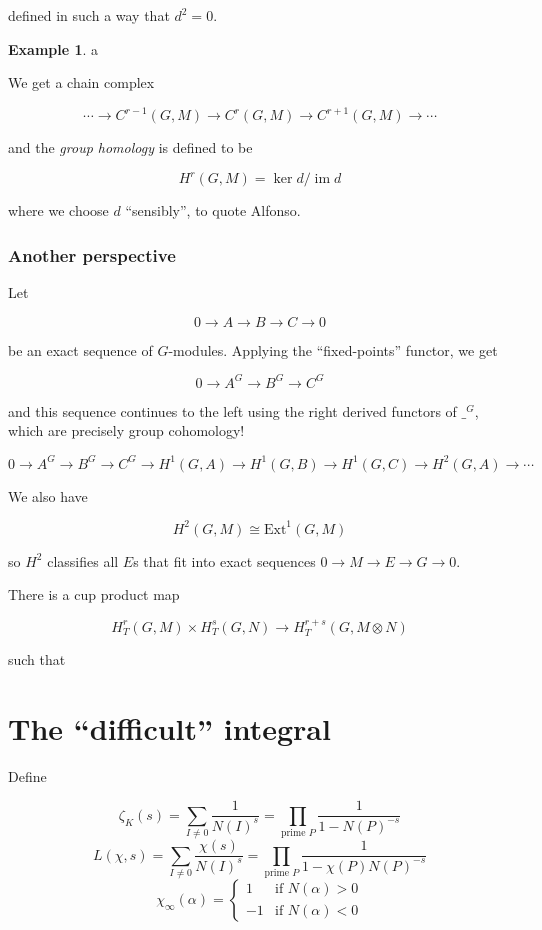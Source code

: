 \documentclass{article}
\DeclareMathOperator{\im}{im}
\theoremstyle{definition}
\newtheorem*{example}{Example}
\begin{document}
defined in such a way that $d^2 = 0$.

\begin{example}
 a 
\end{example}

We get a chain complex

$$\cdots\to C^{r-1}(G,M)\to C^r(G,M)\to C^{r+1}(G,M) \to \cdots$$

and the \textit{group homology} is defined to be

$$H^r(G,M) = \ker d/\im d$$

where we choose $d$ ``sensibly'', to quote Alfonso.

\subsubsection{Another perspective}

Let

$$0\to A\to B\to C\to 0$$

be an exact sequence of $G$-modules. Applying the ``fixed-points'' functor, we
get

$$0\to A^G\to B^G\to C^G$$

and this sequence continues to the left using the right derived functors of
$\_^G$, which are precisely group cohomology!

$$0\to A^G\to B^G\to C^G\to H^1(G,A)\to H^1(G,B)\to H^1(G,C)\to H^2(G,A)\to\cdots$$

We also have

$$H^2(G,M)\cong\text{Ext}^1(G,M)$$

so $H^2$ classifies all $E$s that fit into exact sequences $0\to M\to E\to G\to 0$.

There is a cup product map

$$H^r_T(G,M)\times H^s_T(G,N)\to H^{r+s}_T(G,M\otimes N)$$

such that


\section{The ``difficult'' integral}
Define

$$\zeta_K(s) = \sum_{I\neq 0} \frac1{{N(I)}^s} = \prod_{\text{prime } P}\frac1{1-{N(P)^{-s}}}$$
$$L(\chi,s) = \sum_{I\neq 0} \frac{\chi(s)}{{N(I)}^s} = \prod_{\text{prime } P}\frac1{1-{\chi(P)}{N(P)^{-s}}}$$
$$\chi_{\infty}(\alpha) = \begin{cases}
  1 &\text{if } N(\alpha) > 0 \\
  -1 &\text{if } N(\alpha) < 0
  \end{cases}$$
\end{document}
